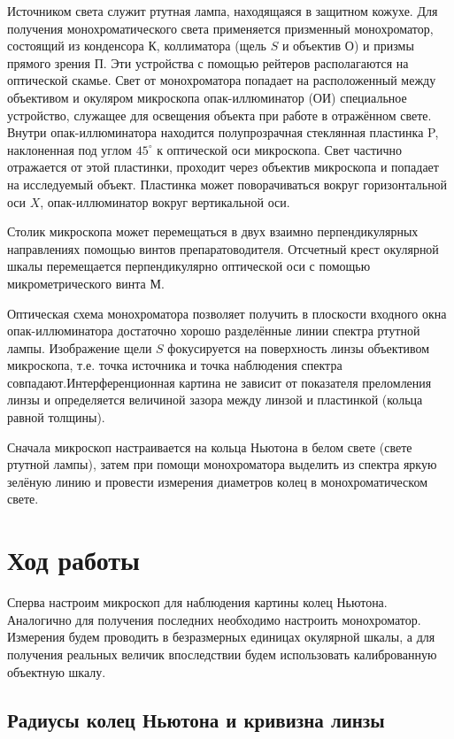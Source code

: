 \documentclass[a4paper, 12pt]{article}%
\begin{document}
	Источником света служит ртутная лампа, находящаяся в защитном кожухе. Для получения монохроматического света применяется призменный монохроматор, состоящий из конденсора $ К $, коллиматора (щель $ S $ и объектив $ О $) и призмы прямого зрения $ П $. Эти устройства с помощью рейтеров располагаются на оптической скамье. Свет от монохроматора попадает на расположенный между объективом и окуляром микроскопа опак-иллюминатор (ОИ)  специальное устройство, служащее для освещения объекта при работе в отражённом свете. Внутри опак-иллюминатора находится полупрозрачная стеклянная пластинка P, наклоненная под углом $ 45^\circ $ к оптической оси микроскопа. Свет частично отражается от этой пластинки, проходит через объектив микроскопа и попадает на исследуемый объект. Пластинка может поворачиваться вокруг горизонтальной оси $ X $, опак-иллюминатор вокруг вертикальной оси.

	Столик микроскопа может перемещаться в двух взаимно перпендикулярных направлениях помощью винтов препаратоводителя. Отсчетный крест окулярной шкалы перемещается перпендикулярно оптической оси с помощью микрометрического винта $ М $.
	
	Оптическая схема монохроматора позволяет получить в плоскости входного окна опак-иллюминатора достаточно хорошо разделённые линии спектра ртутной лампы. Изображение щели $ S $ фокусируется на поверхность линзы объективом микроскопа, т.е. точка источника и точка наблюдения спектра совпадают.Интерференционная картина не зависит от показателя преломления линзы и определяется величиной зазора между линзой и пластинкой (кольца равной толщины).

	Сначала микроскоп настраивается на кольца Ньютона в белом свете (свете ртутной лампы), затем при помощи монохроматора выделить из спектра яркую зелёную линию и провести измерения диаметров колец в монохроматическом свете. 
	

\section{Ход работы}

Сперва настроим микроскоп для наблюдения картины колец Ньютона. Аналогично для получения последних необходимо настроить монохроматор. Измерения будем проводить в безразмерных единицах окулярной шкалы, а для получения реальных величик впоследствии будем использовать калиброванную объектную шкалу.

\subsection{Радиусы колец Ньютона и кривизна линзы}
\end{document}
